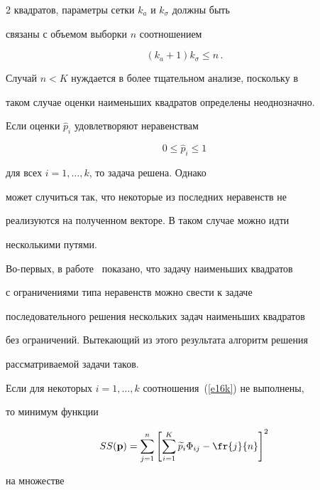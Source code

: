 \begin{multicols}{2}
квадратов, параметры сетки $k_a$ и $k_{\sigma}$ должны быть


связаны с объемом выборки $n$ соотношением


$$


(k_a+1)k_{\sigma}\le n\,.


$$





Случай $n<K$ нуждается в более тщательном анализе, поскольку в


таком случае оценки наименьших квадратов определены неоднозначно.





Если оценки $\widehat p_i$ удовлетворяют неравенствам


\begin{equation}


0\le\widehat p_i\le 1


\label{e16k}


\end{equation}


для всех $i=1,\ldots,k$, то задача решена. Однако


может случиться так, что некоторые из последних неравенств не


реализуются на полученном векторе. В таком случае можно идти


несколькими путями.





Во-первых, в работе~\cite{4k} показано, что задачу наименьших квадратов


с ограничениями типа неравенств можно свести к задаче


последовательного решения нескольких задач наименьших квадратов


без ограничений. Вытекающий из этого результата алгоритм решения


рассматриваемой задачи таков.





Если для некоторых $i=1,\ldots,k$ соотношения~(\ref{e16k}) не выполнены,


то минимум функции


$$ SS({\mathbf p})=\sum_{j=1}^n\left [\sum_{i=1}^K\widetilde


p_i\Phi_{ij}-\fr{j}{n}\right ]^2


$$


на множестве



\end{multicols}
